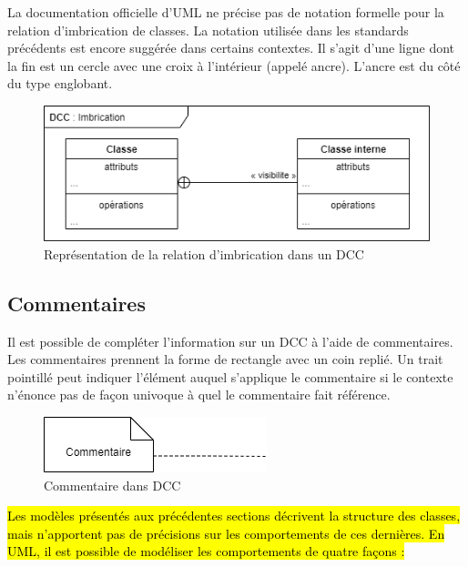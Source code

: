 La documentation officielle d'\acrshort{UML} ne précise pas de notation formelle pour la relation d'imbrication de classes. La notation utilisée dans les standards précédents est encore suggérée dans certains contextes. Il s'agit d'une ligne dont la fin est un cercle avec une croix à l'intérieur (appelé ancre). L'ancre est du côté du type englobant.

\begin{figure}[H]
	\caption{Représentation de la relation d'imbrication dans un \acrshort{DCC}}
	\centering
	\includegraphics[scale=0.7]{dcc-imbrication.png}
\end{figure}

\subsection{Commentaires}
\label{ssec:dcc-commentaires}

Il est possible de compléter l'information sur un \acrshort{DCC} à l'aide de commentaires. Les commentaires prennent la forme de rectangle avec un coin replié. Un trait pointillé peut indiquer l'élément auquel s'applique le commentaire si le contexte n'énonce pas de façon univoque à quel le commentaire fait référence.


\begin{figure}[H]
	\caption{Commentaire dans \acrshort{DCC}}
	\centering
	\includegraphics[scale=0.7]{dcc-commentaire.png}
\end{figure}

\label{sec:det}

\hl{Les modèles présentés aux précédentes sections décrivent la structure des classes, mais n'apportent pas de précisions sur les comportements de ces dernières. En UML, il est possible de modéliser les comportements de quatre façons :}

